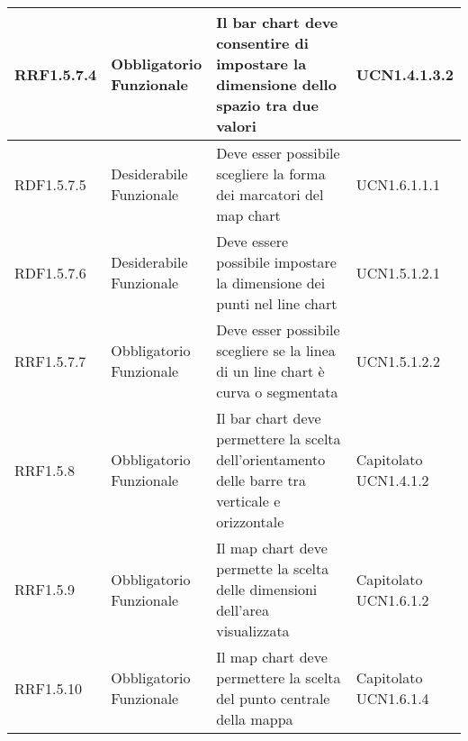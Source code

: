 \begin{longtabu}[c]{|X[0.7,l]|X[l]|X[2.5,l]|X[l]|}
                RRF1.5.7.4 & 
                \parbox[t]{4cm}{ Obbligatorio \\ Funzionale} & Il bar chart deve consentire di impostare la dimensione dello spazio tra due valori & \parbox[t]{4cm}{UCN1.4.1.3.2 }  \\ 
                \hline
                
                RDF1.5.7.5 & 
                \parbox[t]{4cm}{ Desiderabile \\ Funzionale} & Deve esser possibile scegliere la forma dei marcatori del map chart & \parbox[t]{4cm}{UCN1.6.1.1.1 }  \\ 
                \hline
                
                RDF1.5.7.6 & 
                \parbox[t]{4cm}{ Desiderabile \\ Funzionale} & Deve essere possibile impostare la dimensione dei punti nel line chart & \parbox[t]{4cm}{UCN1.5.1.2.1 }  \\ 
                \hline
                
                RRF1.5.7.7 & 
                \parbox[t]{4cm}{ Obbligatorio \\ Funzionale} & Deve esser possibile scegliere se la linea di un line chart è curva o segmentata & \parbox[t]{4cm}{UCN1.5.1.2.2 }  \\ 
                \hline
                
                RRF1.5.8 & 
                \parbox[t]{4cm}{ Obbligatorio \\ Funzionale} & Il bar chart deve permettere la scelta dell'orientamento delle barre tra verticale e orizzontale & \parbox[t]{4cm}{Capitolato \\ UCN1.4.1.2 }  \\ 
                \hline
                
                RRF1.5.9 & 
                \parbox[t]{4cm}{ Obbligatorio \\ Funzionale} & Il map chart deve permette la scelta delle dimensioni dell'area visualizzata & \parbox[t]{4cm}{Capitolato \\ UCN1.6.1.2 }  \\ 
                \hline
                
                RRF1.5.10 & 
                \parbox[t]{4cm}{ Obbligatorio \\ Funzionale} & Il map chart deve permettere la scelta del punto centrale della mappa & \parbox[t]{4cm}{Capitolato \\ UCN1.6.1.4 }  \\ 
                \hline
                

\end{longtabu}
